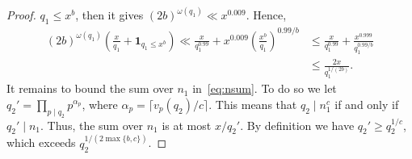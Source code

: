 \documentclass[11pt,letterpaper]{amsart}
\renewcommand{\leq}{\leqslant}
\renewcommand{\geq}{\geqslant}
\theoremstyle{definition}
\numberwithin{equation}{section}
\newcommand{\0}{\mathbf{0}}
\begin{document}
\begin{proof}
$q_1 \leq x^b$, then  it gives   $(2b)^{\omega(q_1)} \ll  x^{0.009} $. Hence, 
\begin{align*}
(2b)^{\omega(q_1) }
\left( \frac{x}{q_1}+ \mathbf 1_{q_1\leq x^b}\right) \ll \frac{x}{q_1^{0.99}}+x^{0.009} \left(\frac{x^b}{q_1}\right)^{0.99/b}
&\leq  \frac{x}{q_1^{0.99}}+\frac{x^{0.999}}{q_1^{0.99/b}}\\ &\leq  \frac{2x}{q_1^{1/(2b)}}
.
\end{align*}
It remains to bound the sum over $n_1$ in~\eqref{eq:nsum}. To do so 
we let $q_2'=\prod_{p \mid q_2} p^{ \alpha_p }$, where $\alpha_p=\lceil v_p(q_2)/c\rceil$. 
 This means that 
$q_2\mid n_1^c$ if and only if $ q_2' \mid n_1$. Thus, the sum over $n_1 $  is at most  $x/q_2'$.   By definition we have  $q_2' \geq q_2^{1/c}$, 
which exceeds $q_2^{1/(2\max\{b,c\}) }$.  \end{proof}
\end{document}
